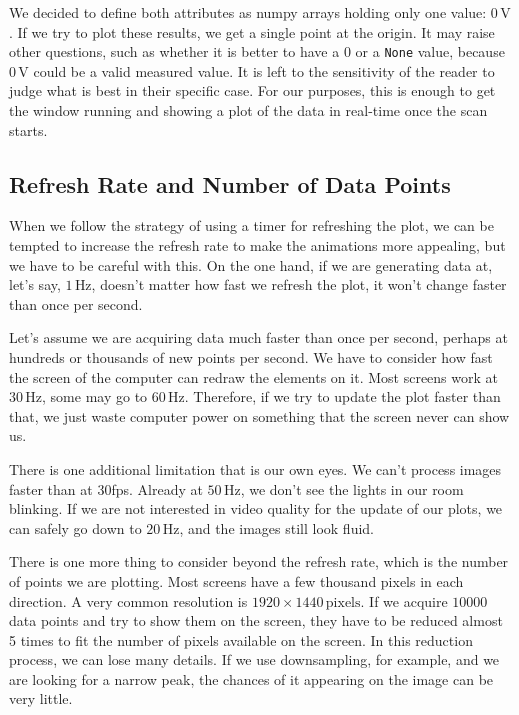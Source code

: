We decided to define both attributes as numpy arrays holding only one value: $0\,\textrm{V}$. If we try to plot these results, we get a single point at the origin. It may raise other questions, such as whether it is better to have a $0$ or a \texttt{None} value, because $0\,\textrm{V}$ could be a valid measured value. It is left to the sensitivity of the reader to judge what is best in their specific case. For our purposes, this is enough to get the window running and showing a plot of the data in real-time once the scan starts.


\subsection{Refresh Rate and Number of Data Points}\label{subsec:refresh-rate-and-number-of-data-points}
When we follow the strategy of using a timer for refreshing the plot, we can be tempted to increase the refresh rate to make the animations more appealing, but we have to be careful with this. On the one hand, if we are generating data at, let's say, $1\,\textrm{Hz}$, doesn't matter how fast we refresh the plot, it won't change faster than once per second.

Let's assume we are acquiring data much faster than once per second, perhaps at hundreds or thousands of new points per second. We have to consider how fast the screen of the computer can redraw the elements on it. Most screens work at $30\,\textrm{Hz}$, some may go to $60\,\textrm{Hz}$. Therefore, if we try to update the plot faster than that, we just waste computer power on something that the screen never can show us.

There is one additional limitation that is our own eyes. We can't process images faster than at 30fps. Already at $50\,\textrm{Hz}$, we don't see the lights in our room blinking. If we are not interested in video quality for the update of our plots, we can safely go down to $20\,\textrm{Hz}$, and the images still look fluid.


There is one more thing to consider beyond the refresh rate, which is the number of points we are plotting. Most screens have a few thousand pixels in each direction. A very common resolution is $1920\times1440\,\textrm{pixels}$. If we acquire $10000$ data points and try to show them on the screen, they have to be reduced almost 5 times to fit the number of pixels available on the screen. In this reduction process, we can lose many details. If we use downsampling, for example, and we are looking for a narrow peak, the chances of it appearing on the image can be very little.

